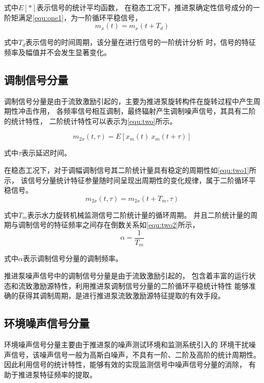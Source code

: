 式中$E[*]$表示信号的统计平均函数，
在稳态工况下，推进泵确定性信号成分的一阶矩满足\autoref{equ:one1}，为一阶循环平稳信号，
\begin{equation}
    \label{equ:one1}
    m_{x}\left ( t \right ) =m_{x}\left ( t+T_d \right )
\end{equation}

式中$T_{d}$表示信号的时间周期，该分量在进行信号的一阶统计分析
时，信号的特征频率及幅值并不会发生显著变化。
\subsection{调制信号分量}
调制信号分量是由于流致激励引起的，主要为推进泵旋转构件在旋转过程中产生周期性冲击作用，
各频率信号相互调制，最终辐射产生调制噪声信号，其具有二阶的统计特性，
二阶统计特性可以表示为\autoref{equ:two}所示。

\begin{equation}
    \label{equ:two}
    m_{2x}\left ( t, \tau \right )  =E\left [ x_{m}\left ( t \right ) \ x_{m}\left ( t+\tau \right )  \right ] 
\end{equation}

式中$\tau$表示延迟时间。

在稳态工况下，对于调幅调制信号其二阶统计量具有稳定的周期性如\autoref{equ:two1}所示，
该信号分量统计特征参量随时间呈现出周期性的变化规律，属于二阶循环平稳信号。
\begin{equation}
    \label{equ:two1}
    m_{2x}\left ( t, \tau \right )  =m_{2x}\left ( t+T_m, \tau \right )
\end{equation}

式中$T_m$表示水力旋转机械监测信号二阶统计量的循环周期。
并且二阶统计量的周期与调制信号的特征频率之间存在倒数关系如\autoref{equ:two2}所示，
\begin{equation}
    \label{equ:two2}
    \alpha =\frac{1}{T_{m} } 
\end{equation}

式中$\alpha$表示调制信号分量的调制频率。 

推进泵噪声信号中的调制信号分量是由于流致激励引起的，
包含着丰富的运行状态和流致激励源特性，利用推进泵调制信号分量的二阶循环平稳统计特性
能够准确的获得其调制周期，是进行推进泵流致激励源特征提取的有效手段。
\subsection{环境噪声信号分量}
环境噪声信号分量主要由于推进泵的噪声测试环境和监测系统引入的
环境干扰噪声信号，该噪声信号一般为高斯白噪声，不具有一阶、二阶及高阶的统计周期性。
因此利用信号的统计特性，能够有效的实现监测信号中噪声信号分量的消除，
有助于推进泵特征频率的提取。

